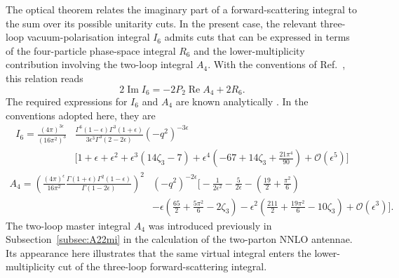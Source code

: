 The optical theorem relates the imaginary part of a forward-scattering integral to the sum over
its possible unitarity cuts. In the present case, the relevant three-loop vacuum-polarisation
integral $I_6$ admits cuts that can be expressed in terms of the four-particle phase-space
integral $R_6$ and the lower-multiplicity contribution involving the two-loop integral $A_4$.
With the conventions of Ref.~\cite{GehrmannDeRidder0311276}, this relation reads
\begin{equation}
    2\operatorname{Im}I_6 = -2P_2\operatorname{Re}A_4 + 2R_6.
\end{equation}
The required expressions for $I_6$ and $A_4$ are known analytically
\cite{GehrmannDeRidder0311276}. In the conventions adopted here, they are
\begin{equation}
    \begin{split}
        I_6 = \frac{(4\pi)^{3\epsilon}}{\left(16\pi^2\right)^3}&\frac{\Gamma^6(1-\epsilon)\Gamma^3(1+\epsilon)}{3\epsilon^3\Gamma^3(2-2\epsilon)}\!\left(-q^2\right)^{-3\epsilon}\\
                                                                      &\Bigg[1+\epsilon+\epsilon^2+\epsilon^3(14\zeta_3-7)+\epsilon^4\left(-67+14\zeta_3+\frac{21\pi^4}{90}\right)+\mathcal O\!\left(\epsilon^5\right)\Bigg]
    \end{split}
\end{equation}
\begin{equation}
    \begin{split}
        A_4 = \left(\frac{(4\pi)^\epsilon}{16\pi^2}\frac{\Gamma(1+\epsilon)\Gamma^2(1-\epsilon)}{\Gamma(1-2\epsilon)}\right)^2&\!\left(-q^2\right)^{-2\epsilon}\Bigg[-\frac1{2\epsilon^2}-\frac5{2\epsilon}-\left(\frac{19}2+\frac{\pi^2}6\right)\\
                                                                                                                              &-\epsilon\left(\frac{65}2+\frac{5\pi^2}6-2\zeta_3\right)-\epsilon^2\left(\frac{211}2+\frac{19\pi^2}6-10\zeta_3\right)+\mathcal O\!\left(\epsilon^3\right)\Bigg].
    \end{split}
\end{equation}
The two-loop master integral $A_4$ was introduced previously in Subsection~\ref{subsec:A22mi}
in the calculation of the two-parton NNLO antennae. Its appearance here illustrates that the
same virtual integral enters the lower-multiplicity cut of the three-loop forward-scattering
integral.

